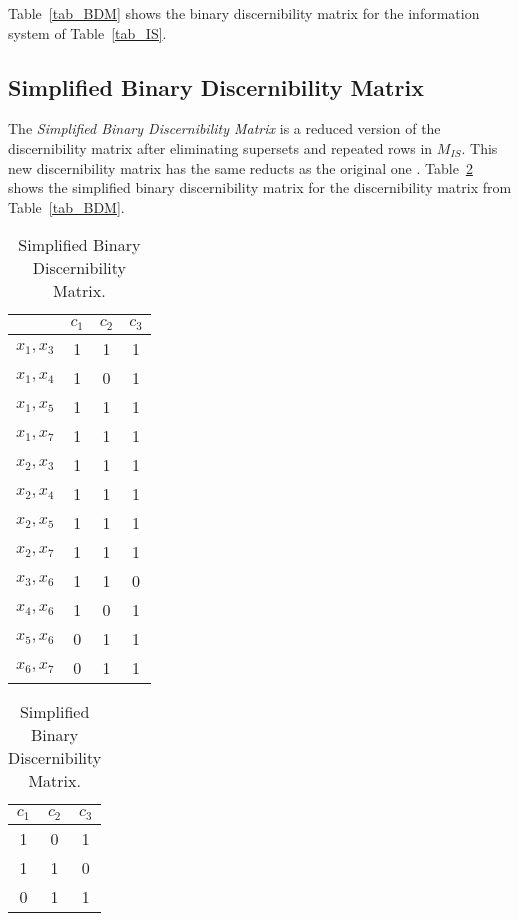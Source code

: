 \documentclass[citenumber]{llncs}
\begin{document}
  Table~\ref{tab_BDM} shows the binary discernibility matrix for the information system of Table~\ref{tab_IS}.  
  
  
\subsection{Simplified Binary Discernibility Matrix}
  The \textit{Simplified Binary Discernibility Matrix} is a reduced version of the discernibility matrix after
  eliminating supersets and repeated rows in $M_{IS}$. This new discernibility matrix has the same reducts
  as the original one \cite{Yao09}. Table~\ref{tab_SDM} shows the simplified binary discernibility matrix for the
  discernibility matrix from Table~\ref{tab_BDM}.
  
    \begin{table}[htb]
    \centering
        \begin{minipage}[b]{0.49\hsize}\centering
  		\caption{Binary Discernibility Matrix.} \label{tab_BDM}
   		\begin{tabular}{cccc}
	   		& $c_1$ & $c_2$ & $c_3$\\
	   		\hline
	  		$x_1,x_3$ & 1 & 1 & 1 \\
	  		$x_1,x_4$ & 1 & 0 & 1 \\
	  		$x_1,x_5$ & 1 & 1 & 1 \\
	  		$x_1,x_7$ & 1 & 1 & 1 \\
	  		$x_2,x_3$ & 1 & 1 & 1 \\
	  		$x_2,x_4$ & 1 & 1 & 1 \\
	  		$x_2,x_5$ & 1 & 1 & 1 \\
	  		$x_2,x_7$ & 1 & 1 & 1 \\
	  		$x_3,x_6$ & 1 & 1 & 0 \\
	  		$x_4,x_6$ & 1 & 0 & 1 \\
	  		$x_5,x_6$ & 0 & 1 & 1 \\
	  		$x_6,x_7$ & 0 & 1 & 1 
	   	\end{tabular}             
    	\end{minipage}
 		\hfill
 		\begin{minipage}[b]{0.49\hsize}\centering
		\caption{Simplified Binary Discernibility Matrix.} \label{tab_SDM}
		\centering
	 	\begin{tabular}{ccc}
	 		$c_1$ & $c_2$ & $c_3$\\
	 		\hline
			1 & 0 & 1 \\
			1 & 1 & 0 \\
			0 & 1 & 1
	 	\end{tabular}   
	 	\bigskip \medskip \\~\\
	 	\end{minipage}  
 \end{table}
 
\end{document}
